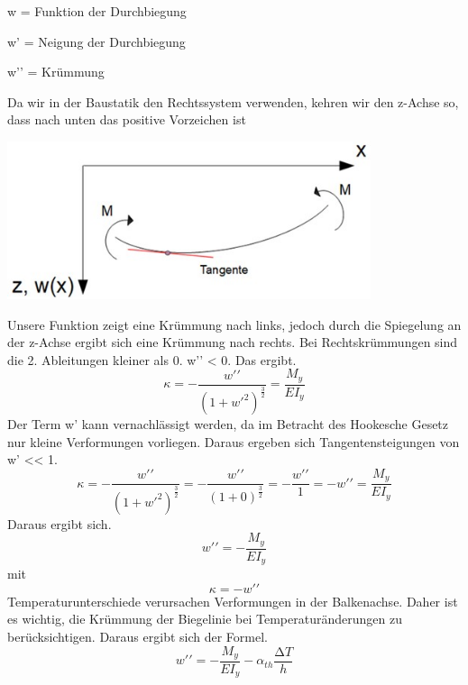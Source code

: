 w = Funktion der Durchbiegung

w’ = Neigung der Durchbiegung

w’’ = Krümmung

Da wir in der Baustatik den Rechtssystem verwenden, kehren wir den z-Achse so, dass nach unten das positive Vorzeichen ist

\begin{center}
	\includegraphics[width=0.8\textwidth]{papers/balken/images/teil2/Biegung_verdrehte_Achsen.jpg}
\end{center}
\label{Abbildung von den verdrehten z-Achse und die positive Momenten, welche auf der Biegelinie wirken.}
Unsere Funktion zeigt eine Krümmung nach links, jedoch durch die Spiegelung an der z-Achse ergibt sich eine Krümmung nach rechts.
Bei Rechtskrümmungen sind die 2. Ableitungen kleiner als 0. w’’ < 0.
Das ergibt.
\begin{equation}
	\kappa=
	-\frac{w\prime\prime}{\left(1+{w\prime}^2\right)^\frac{3}{2}}=
	\frac{M_y}{EI_y}
\end{equation}
Der Term w’ kann vernachlässigt werden, da im Betracht des Hookesche Gesetz nur kleine Verformungen vorliegen.
Daraus ergeben sich Tangentensteigungen von w’ << 1.
\begin{equation}
	\kappa=
	-\frac{w\prime\prime}{\left(1+{w\prime}^2\right)^\frac{3}{2}}=
	-\frac{w\prime\prime}{\left(1+0\right)^\frac{3}{2}}=
	-\frac{w\prime\prime}{1}=-w\prime\prime=
	\frac{M_y}{EI_y}
\end{equation}
Daraus ergibt sich.
\begin{equation}
	w\prime\prime=
	-\frac{M_y}{EI_y}
\end{equation}
mit
\begin{equation}
	\kappa=
	-w\prime\prime
\end{equation}
Temperaturunterschiede verursachen Verformungen in der Balkenachse.
Daher ist es wichtig, die Krümmung der Biegelinie bei Temperaturänderungen zu berücksichtigen.
Daraus ergibt sich der Formel.
\begin{equation}
	w\prime\prime=
	-\frac{M_y}{EI_y}-\alpha_{th}\frac{∆T}{h}
\end{equation}

